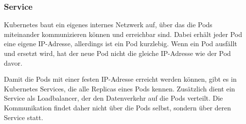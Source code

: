 \subsubsection{Service}

Kubernetes baut ein eigenes internes Netzwerk auf, über das die Pods miteinander kommunizieren können und erreichbar sind.
Dabei erhält jeder Pod eine eigene IP-Adresse, allerdings ist ein Pod kurzlebig. Wenn ein Pod ausfällt und ersetzt wird, hat der neue Pod nicht die gleiche IP-Adresse wie der Pod davor.

Damit die Pods mit einer festen IP-Adresse erreicht werden können, gibt es in Kubernetes Services, die alle Replicas eines Pods kennen.
Zusätzlich dient ein Service als Loadbalancer, der den Datenverkehr auf die Pods verteilt.
Die Kommunikation findet daher nicht über die Pods selbst, sondern über deren Service statt.